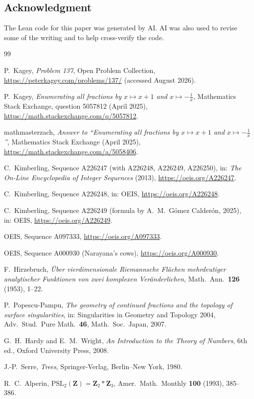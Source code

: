 \documentclass[11pt]{article}
\theoremstyle{definition}
\theoremstyle{remark}
\begin{document}
\subsection*{Acknowledgment}
The Lean code for this paper was generated by AI. AI was also used to revise some of the
writing and to help cross-verify the code.

\begin{thebibliography}{99}\small\setlength{\itemsep}{1pt}

P.~Kagey, \emph{Problem 137}, Open Problem Collection,
\url{https://peterkagey.com/problems/137/} (accessed August 2026).

P.~Kagey, \emph{Enumerating all fractions by $x\mapsto x+1$ and $x\mapsto-\frac1x$},
Mathematics Stack Exchange, question 5057812 (April 2025),
\url{https://math.stackexchange.com/q/5057812}.

mathmasterzach, \emph{Answer to ``Enumerating all fractions by $x\mapsto x+1$ and
$x\mapsto-\frac1x$''}, Mathematics Stack Exchange (April 2025),
\url{https://math.stackexchange.com/a/5058406}.

C.~Kimberling, Sequence A226247 (with A226248, A226249, A226250), in: \emph{The On-Line
Encyclopedia of Integer Sequences} (2013), \url{https://oeis.org/A226247}.

C.~Kimberling, Sequence A226248, in: OEIS, \url{https://oeis.org/A226248}.

C.~Kimberling, Sequence A226249 (formula by A.~M.~G\'omez Calder\'on, 2025), in: OEIS,
\url{https://oeis.org/A226249}.

OEIS, Sequence A097333, \url{https://oeis.org/A097333}.

OEIS, Sequence A000930 (Narayana's cows), \url{https://oeis.org/A000930}.

F.~Hirzebruch, \emph{\"Uber vierdimensionale Riemannsche Fl\"achen mehrdeutiger analytischer
Funktionen von zwei komplexen Ver\"anderlichen}, Math.\ Ann.\ \textbf{126} (1953), 1--22.

P.~Popescu-Pampu, \emph{The geometry of continued fractions and the topology of surface
singularities}, in: Singularities in Geometry and Topology 2004, Adv.\ Stud.\ Pure Math.\ \textbf{46},
Math.\ Soc.\ Japan, 2007.

G.~H.~Hardy and E.~M.~Wright, \emph{An Introduction to the Theory of Numbers}, 6th ed.,
Oxford University Press, 2008.

J.-P.~Serre, \emph{Trees}, Springer-Verlag, Berlin--New York, 1980.

R.~C.~Alperin, \emph{$\mathrm{PSL}_2(\mathbf{Z})=\mathbf{Z}_2*\mathbf{Z}_3$},
Amer.\ Math.\ Monthly \textbf{100} (1993), 385--386.

\end{thebibliography}
\end{document}
